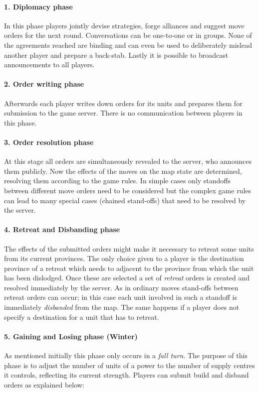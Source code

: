 \documentclass[pdftex,11pt,a4paper]{report}
\begin{document}
\paragraph{1. Diplomacy phase}
In this phase players jointly devise strategies, forge alliances and
suggest move orders for the next round. Conversations can be 
one-to-one or in groups. None of the agreements
reached are binding and can even be used to deliberately 
mislead another player and prepare a back-stab. Lastly it is possible
to broadcast announcements to all players.

\paragraph{2. Order writing phase}
Afterwards each player writes down orders for its units and prepares
them for submission to the game server. There is no communication 
between players in this phase. 

\paragraph{3. Order resolution phase}
At this stage all orders are simultaneously revealed to the server,
who announces them publicly. Now the effects of the moves on the
map state are determined, resolving them according to the game rules.
In simple cases only standoffs between different move orders need
to be considered but the complex game rules can lead to many special
cases (chained stand-offs) that need to be resolved by the server. 

\paragraph{4. Retreat and Disbanding phase}
The effects of the submitted orders might make it necessary to retreat
some units from its current provinces. The only choice given to a
player is the destination province of a retreat which needs to
adjacent to the province from which the unit has been dislodged. Once
these are selected a set of \textit{retreat} orders is created and
resolved immediately by the server. As in ordinary moves stand-offs
between retreat orders can occur; in this case each unit involved in
such a standoff is immediately \textit{disbanded} from the map. The
same happens if a player does not specify a destination for a unit that
has to retreat.

\paragraph{5. Gaining and Losing phase (Winter)}
As mentioned initially this phase only occurs in a \textit{fall turn}.
The purpose of this phase is to adjust the number of units of a power
to the number of supply centres it controls, reflecting its current
strength. Players can submit build and disband orders as explained
below:
\end{document}
